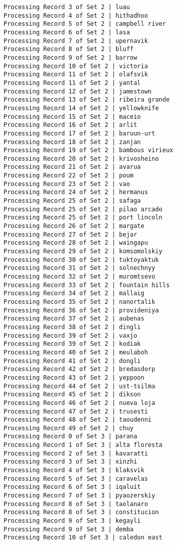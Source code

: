 \documentclass[11pt]{article}
\begin{document}
\begin{Verbatim}[commandchars=\\\{\}]
Processing Record 3 of Set 2 | luau
Processing Record 4 of Set 2 | hithadhoo
Processing Record 5 of Set 2 | campbell river
Processing Record 6 of Set 2 | lasa
Processing Record 7 of Set 2 | upernavik
Processing Record 8 of Set 2 | bluff
Processing Record 9 of Set 2 | barrow
Processing Record 10 of Set 2 | victoria
Processing Record 11 of Set 2 | olafsvik
Processing Record 11 of Set 2 | yantal
Processing Record 12 of Set 2 | jamestown
Processing Record 13 of Set 2 | ribeira grande
Processing Record 14 of Set 2 | yellowknife
Processing Record 15 of Set 2 | maceio
Processing Record 16 of Set 2 | arlit
Processing Record 17 of Set 2 | baruun-urt
Processing Record 18 of Set 2 | zanjan
Processing Record 19 of Set 2 | bambous virieux
Processing Record 20 of Set 2 | krivosheino
Processing Record 21 of Set 2 | avarua
Processing Record 22 of Set 2 | poum
Processing Record 23 of Set 2 | vao
Processing Record 24 of Set 2 | hermanus
Processing Record 25 of Set 2 | safaga
Processing Record 25 of Set 2 | pilao arcado
Processing Record 25 of Set 2 | port lincoln
Processing Record 26 of Set 2 | margate
Processing Record 27 of Set 2 | bejar
Processing Record 28 of Set 2 | waingapu
Processing Record 29 of Set 2 | komsomolskiy
Processing Record 30 of Set 2 | tuktoyaktuk
Processing Record 31 of Set 2 | solnechnyy
Processing Record 32 of Set 2 | muromtsevo
Processing Record 33 of Set 2 | fountain hills
Processing Record 34 of Set 2 | mallaig
Processing Record 35 of Set 2 | nanortalik
Processing Record 36 of Set 2 | provideniya
Processing Record 37 of Set 2 | aubenas
Processing Record 38 of Set 2 | dingli
Processing Record 39 of Set 2 | vaxjo
Processing Record 39 of Set 2 | kodiak
Processing Record 40 of Set 2 | meulaboh
Processing Record 41 of Set 2 | dongli
Processing Record 42 of Set 2 | bredasdorp
Processing Record 43 of Set 2 | yeppoon
Processing Record 44 of Set 2 | ust-tsilma
Processing Record 45 of Set 2 | dikson
Processing Record 46 of Set 2 | nueva loja
Processing Record 47 of Set 2 | trusesti
Processing Record 48 of Set 2 | taoudenni
Processing Record 49 of Set 2 | chuy
Processing Record 0 of Set 3 | parana
Processing Record 1 of Set 3 | alta floresta
Processing Record 2 of Set 3 | kavaratti
Processing Record 3 of Set 3 | xinzhi
Processing Record 4 of Set 3 | klaksvik
Processing Record 5 of Set 3 | caravelas
Processing Record 6 of Set 3 | iqaluit
Processing Record 7 of Set 3 | pyaozerskiy
Processing Record 8 of Set 3 | taolanaro
Processing Record 8 of Set 3 | constitucion
Processing Record 9 of Set 3 | kegayli
Processing Record 9 of Set 3 | demba
Processing Record 10 of Set 3 | caledon east

\end{Verbatim}
\end{document}
